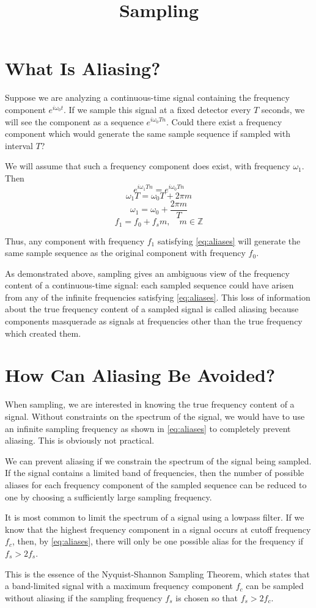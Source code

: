 \documentclass{article}
\title{Sampling}
\date{}
\begin{document}
	
	\maketitle
	
	\section{What Is Aliasing?}
	Suppose we are analyzing a continuous-time signal containing the frequency component $e^{i\omega_0 t}$. If we sample this signal at a fixed detector every $T$ seconds, we will see the component as a sequence $e^{i\omega_0 T n}$. Could there exist a frequency component which would generate the same sample sequence if sampled with interval $T$?
	
	We will assume that such a frequency component does exist, with frequency $\omega_1$. Then
	\[
	e^{i\omega_1 T n} = e^{i\omega_0 T n}
	\]
	\[
	\omega_1 T = \omega_0 T + 2\pi m
	\]
	\[
	\omega_1 = \omega_0 + \frac{2\pi m}{T}
	\]
	\begin{equation} \label{eq:aliases}
	f_1 = f_0 + f_s m, \quad m \in \mathbb{Z}
	\end{equation}
	
	Thus, any component with frequency $f_1$ satisfying \eqref{eq:aliases} will generate the same sample sequence as the original component with frequency $f_0$.
	
	As demonstrated above, sampling gives an ambiguous view of the frequency content of a continuous-time signal: each sampled sequence could have arisen from any of the infinite frequencies satisfying \eqref{eq:aliases}. This loss of information about the true frequency content of a sampled signal is called aliasing because components masquerade as signals at frequencies other than the true frequency which created them.
	
	\section{How Can Aliasing Be Avoided?}
	When sampling, we are interested in knowing the true frequency content of a signal. Without constraints on the spectrum of the signal, we would have to use an infinite sampling frequency as shown in \eqref{eq:aliases} to completely prevent aliasing. This is obviously not practical.
	
	We can prevent aliasing if we constrain the spectrum of the signal being sampled. If the signal contains a limited band of frequencies, then the number of possible aliases for each frequency component of the sampled sequence can be reduced to one by choosing a sufficiently large sampling frequency.
	
	It is most common to limit the spectrum of a signal using a lowpass filter. If we know that the highest frequency component in a signal occurs at cutoff frequency $f_c$, then, by \eqref{eq:aliases}, there will only be one possible alias for the frequency if $f_s > 2 f_s$.
	
	This is the essence of the Nyquist-Shannon Sampling Theorem, which states that a band-limited signal with a maximum frequency component $f_c$ can be sampled without aliasing if the sampling frequency $f_s$ is chosen so that $f_s > 2 f_c$.
	
\end{document}
